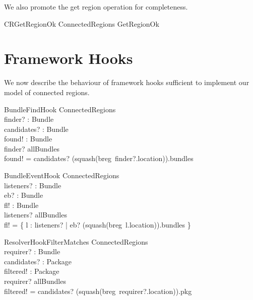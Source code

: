 \documentclass[a4paper,9pt]{article}
\begin{document}
We also promote the get region operation for completeness.
\begin{zed}
  CRGetRegionOk  \Xi ConnectedRegions \land GetRegionOk \\
\end{zed}

\clearpage
\section{Framework Hooks}
\label{cha:fhooks}

We now describe the behaviour of framework hooks sufficient to implement our model
of connected regions.

\begin{schema}{BundleFindHook}
  \Xi ConnectedRegions \\
  finder? : Bundle \\
  candidates? : \power Bundle \\
  found! : \power Bundle \\
\where
  finder? \in allBundles \\
  found! = candidates? \cap (squash(breg~finder?.location)).bundles \\
\end{schema}

\begin{schema}{BundleEventHook}
  \Xi ConnectedRegions \\
  listeners? : \power Bundle \\
  eb? : Bundle \\
  fl! : \power Bundle \\
\where
  listeners? \subseteq allBundles \\
  fl! = \{ l : listeners? | eb? \in (squash(breg~l.location)).bundles \} \\
\end{schema}

\begin{schema}{ResolverHookFilterMatches}
  \Xi ConnectedRegions \\
  requirer? : Bundle \\
  candidates? : \power Package \\
  filtered! : \power Package \\
\where
  requirer? \in allBundles \\
  filtered! = candidates? \cap (squash(breg~requirer?.location)).pkg \\
\end{schema}
\end{document}
